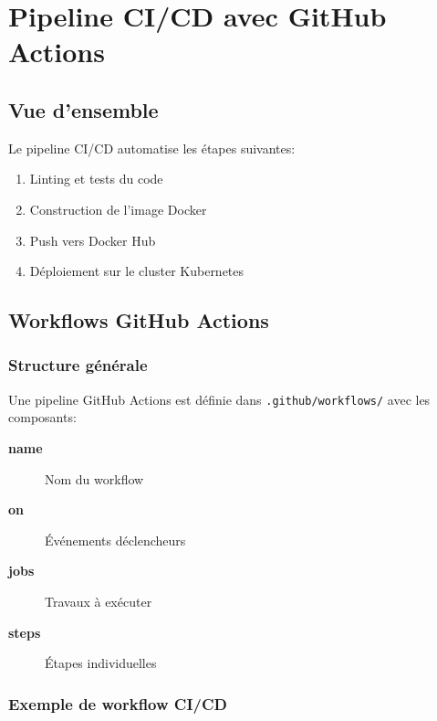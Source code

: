 \documentclass[12pt,a4paper,twoside]{report}
\begin{document}
\chapter{Pipeline CI/CD avec GitHub Actions}

\section{Vue d'ensemble}

Le pipeline CI/CD automatise les étapes suivantes:
\begin{enumerate}
    \item Linting et tests du code
    \item Construction de l'image Docker
    \item Push vers Docker Hub
    \item Déploiement sur le cluster Kubernetes
\end{enumerate}

\section{Workflows GitHub Actions}

\subsection{Structure générale}

Une pipeline GitHub Actions est définie dans \texttt{.github/workflows/} avec les composants:

\begin{description}
    \item[\textbf{name}] Nom du workflow
    \item[\textbf{on}] Événements déclencheurs
    \item[\textbf{jobs}] Travaux à exécuter
    \item[\textbf{steps}] Étapes individuelles
\end{description}

\subsection{Exemple de workflow CI/CD}
\end{document}
